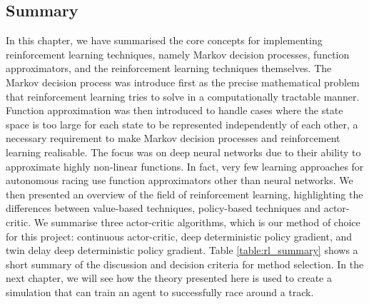 \subsection{Summary}
In this chapter, we have summarised the core concepts for implementing reinforcement learning techniques, namely Markov decision processes, function approximators, and the reinforcement learning techniques themselves.
The Markov decision process was introduce first as the precise mathematical problem that reinforcement learning tries to solve in a computationally tractable manner.
Function approximation was then introduced to handle cases where the state space is too large for each state to be represented independently of each other, a necessary requirement to make Markov decision processes and reinforcement learning realisable.
The focus was on deep neural networks due to their ability to approximate highly non-linear functions. In fact, very few learning approaches for autonomous racing use function approximators other than neural networks.
We then presented an overview of the field of reinforcement learning, highlighting the differences between value-based techniques, policy-based techniques and actor-critic. 
We summarise three actor-critic algorithms, which is our method of choice for this project: continuous actor-critic, deep deterministic policy gradient, and twin delay deep deterministic policy gradient.
Table \ref{table:rl_summary} shows a short summary of the discussion and decision criteria for method selection. 
In the next chapter, we will see how the theory presented here is used to create a simulation that can train an agent to successfully race around a track.

